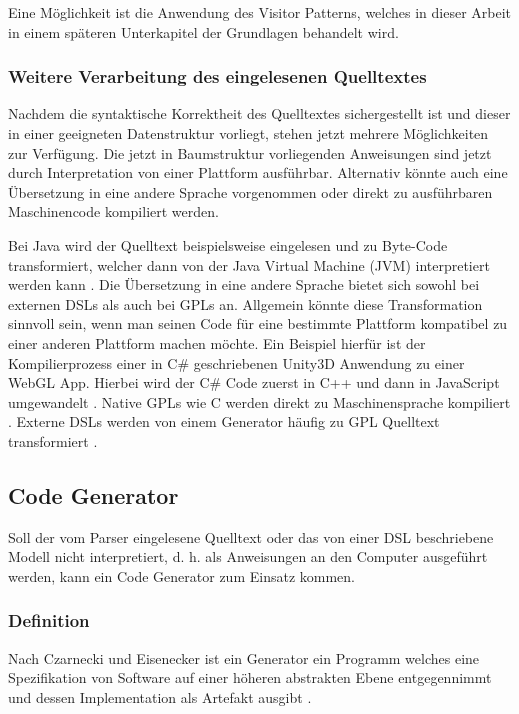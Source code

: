 \documentclass[12pt,oneside,a4paper,parskip]{scrbook}
\begin{document}
Eine Möglichkeit ist die Anwendung des Visitor Patterns, welches in dieser Arbeit in einem späteren Unterkapitel der Grundlagen behandelt wird.

\subsubsection{Weitere Verarbeitung des eingelesenen Quelltextes}

Nachdem die syntaktische Korrektheit des Quelltextes sichergestellt ist und dieser in einer geeigneten Datenstruktur vorliegt, stehen jetzt mehrere Möglichkeiten zur Verfügung. Die jetzt in Baumstruktur vorliegenden Anweisungen sind jetzt durch Interpretation von einer Plattform ausführbar. Alternativ könnte auch eine Übersetzung in eine andere Sprache vorgenommen oder direkt zu ausführbaren Maschinencode kompiliert werden.

Bei Java wird der Quelltext beispielsweise eingelesen und zu Byte-Code transformiert, welcher dann von der Java Virtual Machine (JVM) interpretiert werden kann \cite{javavm2014}. Die Übersetzung in eine andere Sprache bietet sich sowohl bei externen DSLs als auch bei GPLs an. Allgemein könnte diese Transformation sinnvoll sein, wenn man seinen Code für eine bestimmte Plattform kompatibel zu einer anderen Plattform machen möchte. Ein Beispiel hierfür ist der Kompilierprozess einer in C\# geschriebenen Unity3D Anwendung zu einer WebGL App. Hierbei wird der C\# Code zuerst in C++ und dann in JavaScript umgewandelt \cite{unity2018}. Native GPLs wie C werden direkt zu Maschinensprache kompiliert \cite{kernighan1988}. Externe DSLs werden von einem Generator häufig zu GPL Quelltext transformiert \cite[S. 26]{voelter2013}.

\subsection{Code Generator}

Soll der vom Parser eingelesene Quelltext oder das von einer DSL beschriebene Modell nicht interpretiert, d. h. als Anweisungen an den Computer ausgeführt werden, kann ein Code Generator zum Einsatz kommen.

\subsubsection{Definition}

Nach Czarnecki und Eisenecker ist ein Generator ein Programm welches eine Spezifikation von Software auf einer höheren abstrakten Ebene entgegennimmt und dessen Implementation als Artefakt ausgibt \cite[S. 333]{czaeis2000}.
\end{document}
